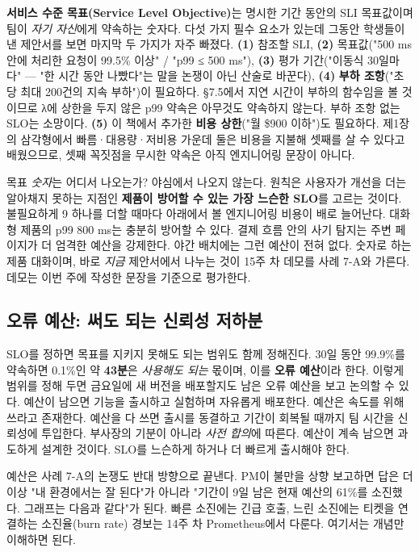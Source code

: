 \textbf{서비스 수준 목표(Service Level Objective)}는 명시한 기간 동안의 SLI 목표값이며 팀이 \textit{자기 자신}에게 약속하는 숫자다. 다섯 가지 필수 요소가 있는데 그동안 학생들이 낸 제안서를 보면 마지막 두 가지가 자주 빠졌다. \textbf{(1)} 참조할 SLI, \textbf{(2)} 목표값("500 ms 안에 처리한 요청이 99.5\% 이상" / "p99 ≤ 500 ms"), \textbf{(3)} 평가 기간("이동식 30일마다" — "한 시간 동안 나빴다"는 말을 논쟁이 아닌 산술로 바꾼다), \textbf{(4)} \textbf{부하 조항}("초당 최대 200건의 지속 부하")이 필요하다. §7.5에서 지연 시간이 부하의 함수임을 볼 것이므로 λ에 상한을 두지 않은 p99 약속은 아무것도 약속하지 않는다. 부하 조항 없는 SLO는 소망이다. \textbf{(5)} 이 책에서 추가한 \textbf{비용 상한}("월 \$900 이하")도 필요하다. 제1장의 삼각형에서 빠름·대용량·저비용 가운데 둘은 비용을 지불해 셋째를 살 수 있다고 배웠으므로, 셋째 꼭짓점을 무시한 약속은 아직 엔지니어링 문장이 아니다.

목표 \textit{숫자}는 어디서 나오는가? 야심에서 나오지 않는다. 원칙은 사용자가 개선을 더는 알아채지 못하는 지점인 \textbf{제품이 방어할 수 있는 가장 느슨한 SLO}를 고르는 것이다. 불필요하게 9 하나를 더할 때마다 아래에서 볼 엔지니어링 비용이 배로 늘어난다. 대화형 제품의 p99 800 ms는 충분히 방어할 수 있다. 결제 흐름 안의 사기 탐지는 주변 페이지가 더 엄격한 예산을 강제한다. 야간 배치에는 그런 예산이 전혀 없다. 숫자로 하는 제품 대화이며, 바로 \textit{지금} 제안서에서 나누는 것이 15주 차 데모를 사례 7-A와 가른다. 데모는 이번 주에 작성한 문장을 기준으로 평가한다.

\subsection*{오류 예산: 써도 되는 신뢰성 저하분}

SLO를 정하면 목표를 지키지 못해도 되는 범위도 함께 정해진다. 30일 동안 99.9\%를 약속하면 0.1\%인 약 \textbf{43분}은 \textit{사용해도 되는} 몫이며, 이를 \textbf{오류 예산}이라 한다. 이렇게 범위를 정해 두면 금요일에 새 버전을 배포할지도 남은 오류 예산을 보고 논의할 수 있다. 예산이 남으면 기능을 출시하고 실험하며 자유롭게 배포한다. 예산은 속도를 위해 쓰라고 존재한다. 예산을 다 쓰면 출시를 동결하고 기간이 회복될 때까지 팀 시간을 신뢰성에 투입한다. 부사장의 기분이 아니라 \textit{사전 합의}에 따른다. 예산이 계속 남으면 과도하게 설계한 것이다. SLO를 느슨하게 하거나 더 빠르게 출시해야 한다.

예산은 사례 7-A의 논쟁도 반대 방향으로 끝낸다. PM이 불만을 상향 보고하면 답은 더 이상 "내 환경에서는 잘 된다"가 아니라 "기간이 9일 남은 현재 예산의 61\%를 소진했다. 그래프는 다음과 같다"가 된다. 빠른 소진에는 긴급 호출, 느린 소진에는 티켓을 연결하는 소진율(burn rate) 경보는 14주 차 Prometheus에서 다룬다. 여기서는 개념만 이해하면 된다.

